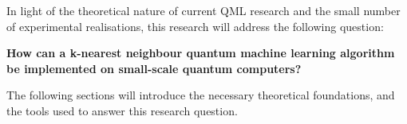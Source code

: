 


In light of the theoretical nature of current QML research and the small number of experimental realisations, this research will address the following question:

\centering\textbf{How can a k-nearest neighbour quantum machine learning algorithm be implemented on small-scale quantum computers?}


\justify
The following sections will introduce the necessary theoretical foundations, and the tools used to answer this research question. 
